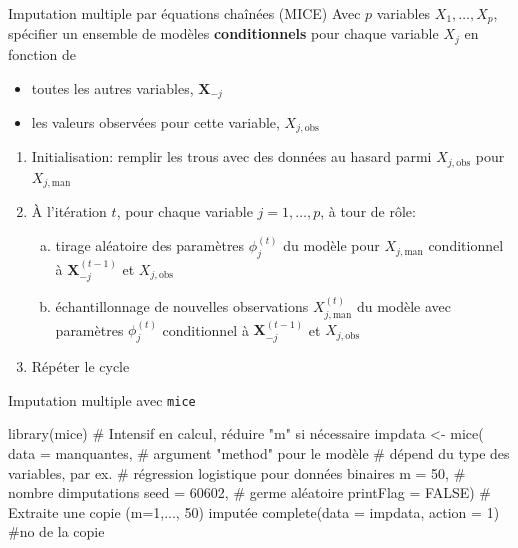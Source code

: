 \documentclass[
  ignorenonframetext,
]{beamer}
\newenvironment{Shaded}{\begin{snugshade}}{\end{snugshade}}
\newcommand{\AttributeTok}[1]{\textcolor[rgb]{0.40,0.45,0.13}{#1}}
\newcommand{\CommentTok}[1]{\textcolor[rgb]{0.37,0.37,0.37}{#1}}
\newcommand{\ConstantTok}[1]{\textcolor[rgb]{0.56,0.35,0.01}{#1}}
\newcommand{\DecValTok}[1]{\textcolor[rgb]{0.68,0.00,0.00}{#1}}
\newcommand{\FunctionTok}[1]{\textcolor[rgb]{0.28,0.35,0.67}{#1}}
\newcommand{\NormalTok}[1]{\textcolor[rgb]{0.00,0.23,0.31}{#1}}
\newcommand{\OtherTok}[1]{\textcolor[rgb]{0.00,0.23,0.31}{#1}}
\providecommand{\tightlist}{%
  \setlength{\itemsep}{0pt}\setlength{\parskip}{0pt}}\usepackage{longtable,booktabs,array}
\begin{document}
\begin{frame}{Imputation multiple par équations chaînées (MICE)}
\protect\hypertarget{imputation-multiple-par-uxe9quations-chauxeenuxe9es-mice}{}
Avec \(p\) variables \(X_1, \ldots, X_p\), spécifier un ensemble de
modèles \textbf{conditionnels} pour chaque variable \(X_j\) en fonction
de

\begin{itemize}
\tightlist
\item
  toutes les autres variables, \(\boldsymbol{X}_{-j}\)
\item
  les valeurs observées pour cette variable, \(X_{j, \text{obs}}\)
\end{itemize}

\begin{enumerate}
\tightlist
\item
  Initialisation: remplir les trous avec des données au hasard parmi
  \(X_{j, \text{obs}}\) pour \(X_{j, \text{man}}\)
\item
  À l'itération \(t\), pour chaque variable \(j=1, \ldots, p\), à tour
  de rôle:

  \begin{enumerate}
  [a)]
  \tightlist
  \item
    tirage aléatoire des paramètres \(\phi_j^{(t)}\) du modèle pour
    \(X_{j,\text{man}}\) conditionnel à \(\boldsymbol{X}_{-j}^{(t-1)}\)
    et \(X_{j, \text{obs}}\)
  \item
    échantillonnage de nouvelles observations \(X^{(t)}_{j,\text{man}}\)
    du modèle avec paramètres \(\phi_j^{(t)}\) conditionnel à
    \(\boldsymbol{X}_{-j}^{(t-1)}\) et \(X_{j, \text{obs}}\)
  \end{enumerate}
\item
  Répéter le cycle
\end{enumerate}
\end{frame}

\begin{frame}[fragile]{Imputation multiple avec \texttt{mice}}
\protect\hypertarget{imputation-multiple-avec-mice}{}
\begin{Shaded}
\begin{Highlighting}[numbers=left,,]
\FunctionTok{library}\NormalTok{(mice)}
\CommentTok{\# Intensif en calcul, réduire "m" si nécessaire}
\NormalTok{impdata }\OtherTok{\textless{}{-}} \FunctionTok{mice}\NormalTok{(}
   \AttributeTok{data =}\NormalTok{ manquantes,}
   \CommentTok{\# argument "method" pour le modèle}
   \CommentTok{\# dépend du type des variables, par ex.}
   \CommentTok{\# régression logistique pour données binaires}
   \AttributeTok{m =} \DecValTok{50}\NormalTok{, }\CommentTok{\# nombre d\textquotesingle{}imputations}
   \AttributeTok{seed =} \DecValTok{60602}\NormalTok{, }\CommentTok{\# germe aléatoire}
   \AttributeTok{printFlag =} \ConstantTok{FALSE}\NormalTok{)}
\CommentTok{\# Extraite une copie (m=1,..., 50) imputée }
\FunctionTok{complete}\NormalTok{(}\AttributeTok{data =}\NormalTok{ impdata, }
         \AttributeTok{action =} \DecValTok{1}\NormalTok{) }\CommentTok{\#no de la copie}
\end{Highlighting}
\end{Shaded}
\end{frame}
\end{document}
